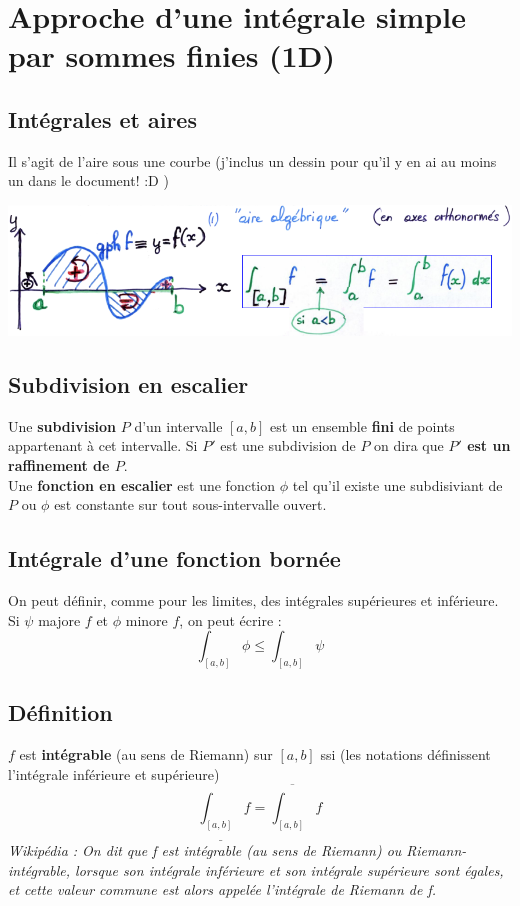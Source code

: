 \documentclass[11pt, a4paper, openany]{book}
\begin{document}
\section{Approche d'une intégrale simple par sommes finies (1D)}
\subsection{Intégrales et aires}
Il s'agit de l'aire sous une courbe (j'inclus un dessin pour qu'il y en ai au moins un dans le document! :D  )
\begin{center}
	\includegraphics[scale=0.55]{image1.png}
\end{center}
\subsection{Subdivision en escalier}
Une \textbf{subdivision} $P$ d'un intervalle $[a, b]$ est un ensemble \textbf{fini} de points appartenant à cet intervalle. Si $P'$ est une subdivision de $P$ on dira que \textbf{$P'$ est un raffinement de $P$}.\\

Une \textbf{fonction en escalier} est une fonction $\phi$ tel qu'il existe une subdisiviant de $P$ ou $\phi$ est constante sur tout sous-intervalle ouvert.

\subsection{Intégrale d'une fonction bornée}
On peut définir, comme pour les limites, des intégrales supérieures et inférieure. Si $\psi$ majore $f$ et $\phi$ minore $f$, on peut écrire :
$$\int_{[a,b]} \phi \leq \int_{[a,b]} \psi$$

\subsection*{Définition}
$f$ est \textbf{intégrable} (au sens de Riemann) sur $[a, b]$ ssi  (les notations définissent l'intégrale inférieure et supérieure)
$$\underline{\int_{[a,b]}} f = \overline{\int_{[a,b]}} f$$
\textit{Wikipédia : On dit que f est intégrable (au sens de Riemann) ou Riemann-intégrable, lorsque son intégrale inférieure et son intégrale supérieure sont égales, et cette valeur commune est alors appelée l'intégrale de Riemann de f.}\\
\end{document}
